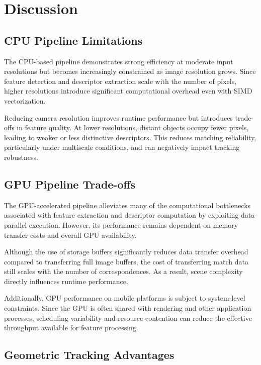 \section{Discussion}

\subsection{CPU Pipeline Limitations}

The CPU-based pipeline demonstrates strong efficiency at moderate input resolutions but becomes increasingly constrained as image resolution grows. Since feature detection and descriptor extraction scale with the number of pixels, higher resolutions introduce significant computational overhead even with SIMD vectorization. 

Reducing camera resolution improves runtime performance but introduces trade-offs in feature quality. At lower resolutions, distant objects occupy fewer pixels, leading to weaker or less distinctive descriptors. This reduces matching reliability, particularly under multiscale conditions, and can negatively impact tracking robustness.

\subsection{GPU Pipeline Trade-offs}

The GPU-accelerated pipeline alleviates many of the computational bottlenecks associated with feature extraction and descriptor computation by exploiting data-parallel execution. However, its performance remains dependent on memory transfer costs and overall GPU availability.

Although the use of storage buffers significantly reduces data transfer overhead compared to transferring full image buffers, the cost of transferring match data still scales with the number of correspondences. As a result, scene complexity directly influences runtime performance.

Additionally, GPU performance on mobile platforms is subject to system-level constraints. Since the GPU is often shared with rendering and other application processes, scheduling variability and resource contention can reduce the effective throughput available for feature processing.

\subsection{Geometric Tracking Advantages}

